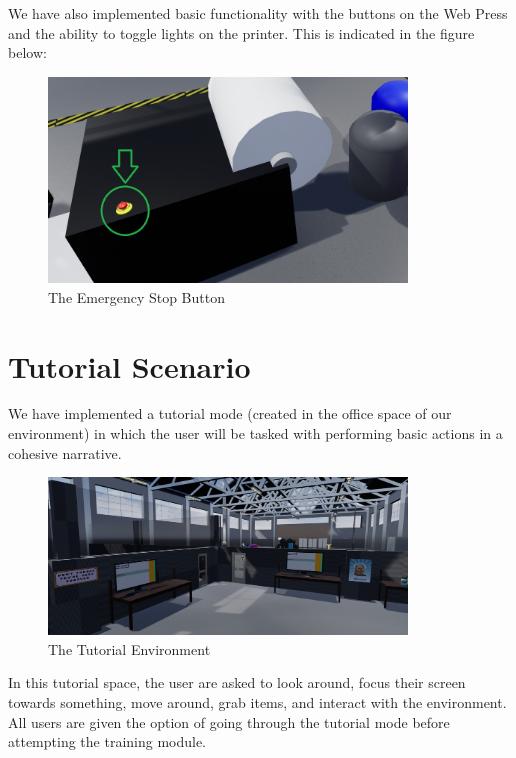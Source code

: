 \documentclass[onecolumn, draftclsnofoot,10pt, compsoc]{IEEEtran}
\begin{document}
We have also implemented basic functionality with the buttons on the Web Press and the ability to toggle lights on the printer. This is indicated in the figure below: 

\begin{figure}[ht!]
    \centering
    \includegraphics[width=0.85\textwidth]{button.png}
    \caption{The Emergency Stop Button}
    \label{fig:stopbutton}
\end{figure}

\section{Tutorial Scenario}

We have implemented a tutorial mode (created in the office space of our environment) in which the user will be tasked with performing basic actions in a cohesive narrative. 

\begin{figure}[ht!]
    \centering
    \includegraphics[width=0.85\textwidth]{tutorialSpace.png}
    \caption{The Tutorial Environment}
    \label{fig:tutorial}
\end{figure}


In this tutorial space, the user are asked to look around, focus their screen towards something, move around, grab items, and interact with the environment. 
All users are given the option of going through the tutorial mode before attempting the training module.
\end{document}
